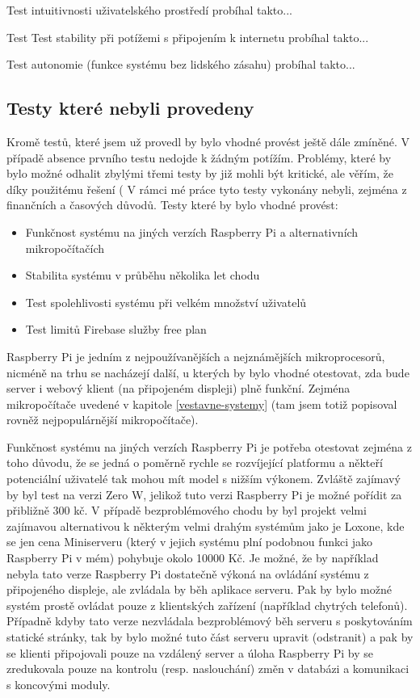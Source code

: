 Test intuitivnosti uživatelského prostředí probíhal takto...

Test Test stability při potížemi s připojením k internetu probíhal takto...

Test autonomie (funkce systému bez lidského zásahu) probíhal takto...

\subsection*{Testy které nebyli provedeny}
\label{neprovedene-testy}
Kromě testů, které jsem už provedl by bylo vhodné provést ještě dále zmíněné. V případě absence prvního testu nedojde k žádným potížím. Problémy, které by bylo možné odhalit zbylými třemi testy by již mohli být kritické, ale věřím, že díky použitému řešení ( V rámci mé práce tyto testy vykonány nebyli, zejména z finančních a časových důvodů.
Testy které by bylo vhodné provést:
\begin{itemize}
    \item Funkčnost systému na jiných verzích Raspberry Pi a alternativních mikropočítačích 
    \item Stabilita systému v průběhu několika let chodu
    \item Test spolehlivosti systému při velkém množství uživatelů
    \item Test limitů Firebase služby free plan
\end{itemize}
Raspberry Pi je jedním z nejpoužívanějších a nejznámějších mikroprocesorů, nicméně na trhu se nacházejí další, u kterých by bylo vhodné otestovat, zda bude server i webový klient (na připojeném displeji) plně funkční. Zejména mikropočítače uvedené v kapitole \ref{vestavne-systemy} (tam jsem totiž popisoval rovněž nejpopulárnější mikropočítače).

Funkčnost systému na jiných verzích Raspberry Pi je potřeba otestovat zejména z toho důvodu, že se jedná o poměrně rychle se rozvíjející platformu a někteří potenciální uživatelé tak mohou mít model s nižším výkonem. Zvláště zajímavý by byl test na verzi Zero W, jelikož tuto verzi Raspberry Pi je možné pořídit za přibližně 300 kč. V případě bezproblémového chodu by byl projekt velmi zajímavou alternativou k některým velmi drahým systémům jako je Loxone, kde se jen cena Miniserveru (který v jejich systému plní podobnou funkci jako Raspberry Pi v mém) pohybuje okolo 10000 Kč. Je možné, že by například nebyla tato verze Raspberry Pi dostatečně výkoná na ovládání systému z připojeného displeje, ale zvládala by běh aplikace serveru. Pak by bylo možné systém prostě ovládat pouze z klientských zařízení (například chytrých telefonů). Případně kdyby tato verze nezvládala bezproblémový běh serveru s poskytováním statické stránky, tak by bylo možné tuto část serveru upravit (odstranit) a pak by se klienti připojovali pouze na vzdálený server a úloha Raspberry Pi by se zredukovala pouze na kontrolu (resp. naslouchání) změn v databázi a komunikaci s koncovými moduly.


